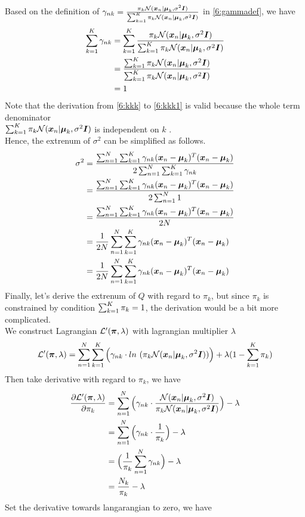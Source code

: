 \documentclass[11pt,a4paper]{article}
\newcommand{\htab}{\hspace*{0.63cm}}
\begin{document}
\htab Based on the definition of $\gamma_{nk} = \frac{\pk \Nk }{\sumk \pk \Nk}$ in \eqref{6:gammadef}, we have
\begin{align}
    \sumk \gamma_{nk} 
    &= \sumk \frac{\pk \Nk }{\sumk \pk \Nk} \label{6:kkk} \\
    &= \frac{\sumk \pk \Nk }{\sumk \pk \Nk} \label{6:kkk1}\\
    &= 1 \label{6:sumkGamma}
    \end{align}
\htab Note that the derivation from \eqref{6:kkk} to \eqref{6:kkk1} is valid because the whole term 
denominator \\ $\sumk \pk \Nk$ is independent on $k$ . \\
\htab Hence, the extrenum of $\sigma^{2}$ can be simplified as follows.
\begin{align}
    \sigma^{2}  
    &= \frac{\sumn \sumk \gamma_{nk} (\difxm)^{T} (\difxm)}
        {2 \sumn \sumk \gamma_{nk}} \\
    &= \frac{\sumn \sumk \gamma_{nk} (\difxm)^{T} (\difxm)}
        {2 \sumn 1} \\
    &= \frac{\sumn \sumk \gamma_{nk} (\difxm)^{T} (\difxm)}
        {2 N} \\
    &= \frac{1}{2N}\sumn \sumk \gamma_{nk} (\difxm)^{T} (\difxm) \\
    &= \frac{1}{2N}\sumn \sumk \gamma_{nk} (\difxm)^{T} (\difxm) 
    \end{align}
\htab Finally, let's derive the extrenum of $Q$ with regard to $\pi_{k}$, but since $\pi_{k}$ is constrained by 
condition $\sumk \pi_{k} = 1$, the derivation would be a bit more complicated. \\
\htab We construct Lagrangian $\lag$ with lagrangian multiplier $\lambda$
\begin{align}
    \lag = \sumn  \sumk \Big( \gamma_{nk} \cdot ln\ ( \pk \Nxn) \Big) + \lambda (1 - \sumk \pi_{k})
    \end{align}
\htab Then take derivative with regard to $\pi_{k}$, we have
\begin{align}
    \frac{\partial \lag}{\partial \pk}
    &= \sumn  \Big( \gamma_{nk} \cdot \frac{\Nxn}{\pk \Nxn} \Big) - \lambda  \\
    &= \sumn \Big( \gamma_{nk} \cdot \frac{1}{\pk }\Big) - \lambda \\
    &=   \Big( \frac{1}{\pk} \sumn  \gamma_{nk}\Big) - \lambda \\
    &=   \frac{N_{k}}{\pk} - \lambda 
    \end{align}
\htab Set the derivative towards langarangian to zero, we have
\end{document}

